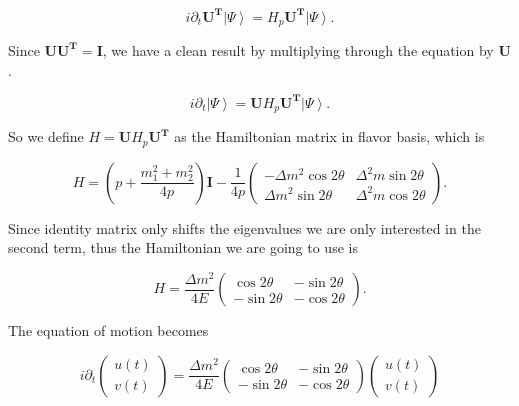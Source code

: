 \documentclass{tufte-handout}
\newcommand{\ket}[1]{\left| #1\right\rangle}
\begin{document}
\begin{equation*}
i\partial_t \mathbf{U^T} \ket{\Psi} = H_p \mathbf{U^T} \ket{\Psi}.
\end{equation*}

Since $\mathbf{U}\mathbf{U^T}=\mathbf{I}$, we have a clean result by multiplying through the equation by $\mathbf{U}$.

\begin{equation*}
i\partial_t \ket{\Psi} = \mathbf{U} H_p \mathbf{U^T} \ket{\Psi}.
\end{equation*}

So we define $H = \mathbf{U}H_p \mathbf{U^T}$ as the Hamiltonian matrix in flavor basis, which is

\begin{equation}
H = \left(p + \frac{m_1^2+m_2^2}{4p} \right)\mathbf I - \frac{1}{4p}\begin{pmatrix} - \Delta m^2 \cos 2\theta & \Delta^2 m \sin 2\theta \\  \Delta m^2 \sin 2\theta & \Delta^2 m\cos 2\theta \end{pmatrix}.
\end{equation}

Since identity matrix only shifts the eigenvalues we are only interested in the second term, thus the Hamiltonian we are going to use is

\begin{equation}
H = \frac{\Delta m^2}{4E} \begin{pmatrix}
\cos 2\theta &  -  \sin 2\theta \\  - \sin 2\theta & - \cos 2\theta
\end{pmatrix}.
\end{equation}

The equation of motion becomes

\begin{equation}
i \partial_t \begin{pmatrix}
u(t) \\ v(t)
\end{pmatrix} = \frac{\Delta m^2}{4E} \begin{pmatrix}
\cos 2\theta &  -  \sin 2\theta \\  - \sin 2\theta & - \cos 2\theta
\end{pmatrix} \begin{pmatrix}
u(t) \\ v(t)
\end{pmatrix}
\end{equation}
\end{document}
